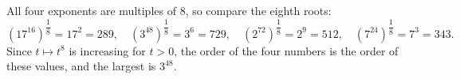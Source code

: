 All four exponents are multiples of $8$, so compare the eighth roots:
\[\left(17^{16}\right)^{\dfrac{1}{8}}=17^2=289,\quad\left(3^{48}\right)^{\dfrac{1}{8}}=3^6=729,\quad\left(2^{72}\right)^{\dfrac{1}{8}}=2^9=512,\quad\left(7^{24}\right)^{\dfrac{1}{8}}=7^3=343 .\]
Since $t\mapsto t^8$ is increasing for $t>0$, the order of the four numbers is the order of these values, and the largest is $\boxed{3^{48}}$.

